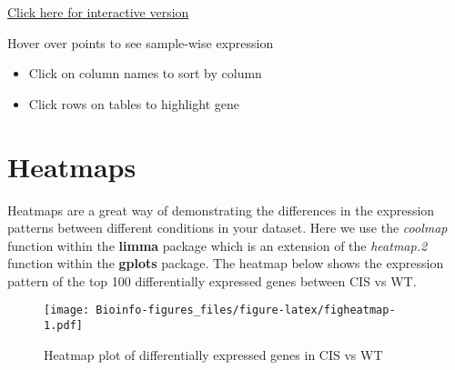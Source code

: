 \documentclass[
  openany]{book}
\newenvironment{Shaded}{\begin{snugshade}}{\end{snugshade}}
\newcommand{\AttributeTok}[1]{\textcolor[rgb]{0.77,0.63,0.00}{#1}}
\newcommand{\DecValTok}[1]{\textcolor[rgb]{0.00,0.00,0.81}{#1}}
\newcommand{\FloatTok}[1]{\textcolor[rgb]{0.00,0.00,0.81}{#1}}
\newcommand{\FunctionTok}[1]{\textcolor[rgb]{0.00,0.00,0.00}{#1}}
\newcommand{\NormalTok}[1]{#1}
\newcommand{\OtherTok}[1]{\textcolor[rgb]{0.56,0.35,0.01}{#1}}
\newcommand{\SpecialCharTok}[1]{\textcolor[rgb]{0.00,0.00,0.00}{#1}}
\begin{document}
\href{glimma-plots/MD-Plot.html}{Click here for interactive version}

Hover over points to see sample-wise expression

\begin{itemize}
\item
  Click on column names to sort by column
\item
  Click rows on tables to highlight gene
\end{itemize}

\hypertarget{heatmaps}{%
\section{Heatmaps}\label{heatmaps}}

Heatmaps are a great way of demonstrating the differences in the expression patterns between different conditions in your dataset. Here we use the \emph{coolmap} function within the \textbf{limma} package which is an extension of the \emph{heatmap.2} function within the \textbf{gplots} package. The heatmap below shows the expression pattern of the top 100 differentially expressed genes between CIS vs WT.

\begin{Shaded}
\end{Shaded}

\begin{figure}
\centering
\texttt{[image: Bioinfo-figures\_files/figure-latex/figheatmap-1.pdf]}
\caption{\label{fig:figheatmap}Heatmap plot of differentially expressed genes in CIS vs WT}
\end{figure}
\end{document}
